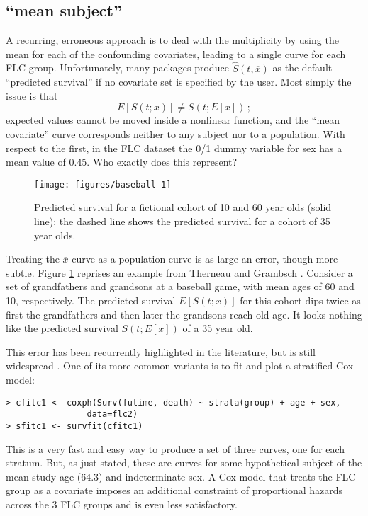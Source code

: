 \documentclass{article}\usepackage[]{graphicx}\usepackage[]{xcolor}
\makeatletter
\def\maxwidth{ %
  \ifdim\Gin@nat@width>\linewidth
    \linewidth
  \else
    \Gin@nat@width
  \fi
}
\newenvironment{kframe}{%
 \def\at@end@of@kframe{}%
 \ifinner\ifhmode%
  \def\at@end@of@kframe{\end{minipage}}%
  \begin{minipage}{\columnwidth}%
 \fi\fi%
 \def\FrameCommand##1{\hskip\@totalleftmargin \hskip-\fboxsep
 \colorbox{shadecolor}{##1}\hskip-\fboxsep
     \hskip-\linewidth \hskip-\@totalleftmargin \hskip\columnwidth}%
 \MakeFramed {\advance\hsize-\width
   \@totalleftmargin\z@ \linewidth\hsize
   \@setminipage}}%
 {\par\unskip\endMakeFramed%
 \at@end@of@kframe}
\newenvironment{knitrout}{}{} %
\newcommand{\xbar}{\overline x}
\makeatother
\begin{document}
\subsection*{``mean subject''}
A recurring, erroneous approach is to deal with the multiplicity by 
using the mean for each of the confounding 
covariates, leading to a single
curve for each FLC group. 
Unfortunately, many packages produce
$\hat S(t, \xbar)$ as the default ``predicted survival'' if no covariate 
set is specified by the user.  
Most simply the issue is that
\begin{equation*}
  E[S(t;x)] \ne S(t; E[x]) \, ;
\end{equation*} 
expected values cannot be moved inside a nonlinear function, and
the ``mean covariate'' curve corresponds neither to any subject nor to
a population.
With respect to the first, 
in the FLC dataset the 0/1 dummy variable for sex has a mean value
of 0.45.  %
Who exactly does this represent? 

\begin{figure}[tb]
\begin{knitrout}
\color{fgcolor}
\texttt{[image: figures/baseball-1]} 
\end{knitrout}
\caption{Predicted survival for a fictional cohort of 10 and 60 year olds 
  (solid line); the dashed line shows the predicted 
  survival for a cohort of 35 year olds.}
\label{figbaseball} 
\end{figure}

Treating the $\xbar$ curve as a population curve is as large an error, 
though more subtle.  Figure \ref{figbaseball} reprises an example 
from Therneau and Grambsch \cite{Therneau00}.  Consider 
a set of grandfathers and grandsons at a baseball game, with mean ages of
60 and 10, respectively.  The predicted survival $E[S(t;x)]$ for this cohort dips
twice as first the grandfathers and then later the grandsons reach old age.
It looks nothing like the predicted survival $S(t; E[x])$ of a 35 year old.

This error has been recurrently highlighted in the literature, but is
still widespread \cite{ghali01}.
One of its more common variants is to fit and plot a stratified Cox
model:

\begin{knitrout}
\color{fgcolor}\begin{kframe}
\begin{verbatim}
> cfitc1 <- coxph(Surv(futime, death) ~ strata(group) + age + sex,
                data=flc2)
> sfitc1 <- survfit(cfitc1)
\end{verbatim}
\end{kframe}
\end{knitrout}
This is a very fast and easy way to produce a set of three curves,
one for each stratum. But, as just stated, these are curves for some
hypothetical subject of the mean study age 
(64.3) and indeterminate sex.   %
A Cox model that treats the FLC group as a covariate imposes
an additional constraint of proportional 
hazards across the 3 FLC groups and is even less satisfactory.
\end{document}
